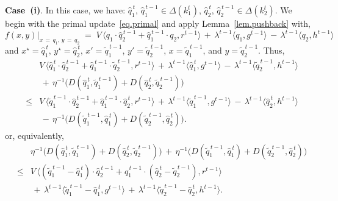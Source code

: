 \documentclass[12pt, final]{l4dc2023}
\begin{document}
\noindent\textbf{Case~(i)}.	In this case, we have: $ \hat q_1^{\,t}$, $\hat q_1^{\,t-1}\in \Delta(k_1^t)$, $ \hat q_2^{\,t}$, $\hat q_2^{\,t-1}\in \Delta(k_2^t)$. 
We begin with the primal update~\eqref{eq.primal} and apply Lemma~\ref{lem.pushback} with, 
\[
f(x,y) \vert_{x\,=\,q_1,\, y\,=\,q_2} 
\;=\;
V\, \big\langle{q_1\cdot \hat q_2^{\,t-1}+\hat q_1^{\,t-1}\cdot q_2},{r^{t-1}}\big\rangle 
\,+\,
\lambda^{t-1} \langle{q_1},{g^{t-1}}\rangle 
\,-\,\lambda^{t-1} \langle{q_2},{h^{t-1}}\rangle 
\]
and $x^\star = \hat q_1^{\,t}$, $y^\star= \hat q_2^{\,t}$, $x' = \tilde q_1^{\,t-1}$, $y'=\tilde q_2^{\,t-1}$, $x = \tilde q_1^{\,t-1}$, and $y=\tilde q_2^{\,t-1}$. Thus, 
\[
\begin{array}{rcl}
&& \!\!\!\! \!\!\!\! \!\!
V\, \big\langle{\hat q_1^{\,t}\cdot \hat q_2^{\,t-1}+\hat q_1^{\,t-1}\cdot  \tilde q_2^{\,t-1}},{r^{t-1}}\big\rangle 
\,+\,
\lambda^{t-1} \langle{\hat q_1^{\,t}},{g^{t-1}}\rangle 
\,-\,\lambda^{t-1} \langle{ \tilde q_2^{\,t-1}},{h^{t-1}}\rangle 
\\[0.2cm]
&& 
\,+\, \eta^{-1} \big(D(\hat q_1^{\,t},\tilde q_1^{\,t-1}) + D(\hat q_2^{\,t}, \tilde q_2^{\,t-1})\big)
\\[0.2cm]
&\leq& V\, \big\langle{ \tilde q_1^{\,t-1}\cdot \hat q_2^{\,t-1}+\hat q_1^{\,t-1}\cdot \hat q_2^{\,t}},{r^{t-1}}\big\rangle 
\,+\,
\lambda^{t-1} \langle{ \tilde q_1^{\,t-1}},{g^{t-1}}\rangle 
\,-\,\lambda^{t-1} \langle{ \hat q_2^{\,t}},{h^{t-1}}\rangle 
\\[0.2cm]
&&
\,-\, \eta^{-1} \big(D( \tilde q_1^{\,t-1},\hat q_1^{\,t}) + D( \tilde q_2^{\,t-1}, \hat q_2^{\,t}) \big).
\end{array}
\]
or, equivalently,
\begin{equation}\label{eq.pushback_I}
\begin{array}{rcl}
&& \!\!\!\! \!\!\!\!  \!\! 
\eta^{-1} \big(D(\hat q_1^{\,t},\tilde q_1^{\,t-1}) + D(\hat q_2^{\,t}, \tilde q_2^{\,t-1})\big)
\,+\,
\eta^{-1} \big(D( \tilde q_1^{\,t-1},\hat q_1^{\,t}) + D( \tilde q_2^{\,t-1}, \hat q_2^{\,t}) \big)
\\[0.2cm]
&\leq&  V\, \big\langle{ (\tilde q_1^{\,t-1} -\hat q_1^{\,t} )\cdot \hat q_2^{\,t-1}+\hat q_1^{\,t-1}\cdot (\hat q_2^{\,t} - \tilde q_2^{\,t-1} )},{r^{t-1}}\big\rangle 
\\[0.2cm]
&& 
\,+\,
\lambda^{t-1} \langle{ \tilde q_1^{\,t-1} - \hat q_1^{\,t} },{g^{t-1}}\rangle 
\,+\,\lambda^{t-1} \langle{ \tilde q_2^{\,t-1} - \hat q_2^{\,t}},{h^{t-1}}\rangle.
\end{array}
\end{equation}
\end{document}
